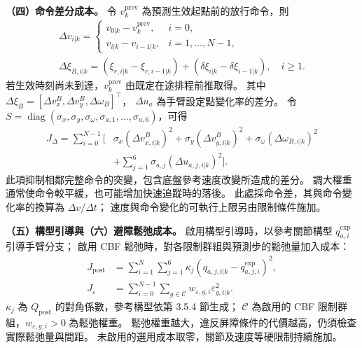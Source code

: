 \noindent\textbf{（四）命令差分成本。}
令 $v_k^{\mathrm{prev}}$ 為預測生效起點前的放行命令，則
\begin{equation}
    \begin{gathered}
        \Delta v_{i|k}=
        \begin{cases}
            v_{0|k}-v_k^{\mathrm{prev}},&i=0,\\
            v_{i|k}-v_{i-1|k},&i=1,\ldots,N-1,
        \end{cases}\\
        \Delta\xi_{B,i|k}=
        (\xi_{r,i|k}-\xi_{r,i-1|k})
        +(\delta\xi_{i|k}-\delta\xi_{i-1|k}),\quad i\geq1 .
    \end{gathered}
    \label{eq:ch3_command_difference_definition}
\end{equation}
若生效時刻尚未到達，$v_k^{\mathrm{prev}}$ 由既定在途排程前推取得。
其中 $\Delta\xi_B=[\Delta v_x^B,\Delta v_y^B,\Delta\omega_B]^\top$，
$\Delta u_a$ 為手臂設定點變化率的差分。
令 $S=\operatorname{diag}(\sigma_x,\sigma_y,\sigma_\omega,
\sigma_{a,1},\ldots,\sigma_{a,6})$，可得
\begin{equation}
    \begin{aligned}
        J_\Delta=\sum_{i=0}^{N-1}\big[&
        \sigma_x(\Delta v_{x,i|k}^{B})^{2}
        +\sigma_y(\Delta v_{y,i|k}^{B})^{2}
        +\sigma_\omega(\Delta\omega_{B,i|k})^{2}\\
        &+\sum_{j=1}^{6}\sigma_{a,j}(\Delta u_{a,j,i|k})^{2}\big].
    \end{aligned}
    \label{eq:ch3_smoothness_cost_expanded}
\end{equation}
此項抑制相鄰完整命令的突變，包含底盤參考速度改變所造成的差分。
調大權重通常使命令較平緩，也可能增加快速追蹤時的落後。
此處採命令差，其與命令變化率的換算為 $\Delta v/\Delta t$；
速度與命令變化的可執行上限另由限制條件施加。

\noindent\textbf{（五）構型引導與（六）避障鬆弛成本。}
啟用構型引導時，以參考關節構型 $q_{a,i}^{\mathrm{exp}}$ 引導手臂分支；
啟用 CBF 鬆弛時，對各限制群組與預測步的鬆弛量加入成本：
\begin{equation}
    \begin{aligned}
        J_{\mathrm{post}}
        &=\sum_{i=1}^{N}\sum_{j=1}^{6}
        \kappa_j(q_{a,j,i|k}-q_{a,j,i}^{\mathrm{exp}})^2,\\
        J_\varepsilon
        &=\sum_{i=0}^{N-1}\sum_{g\in\mathcal C}
        w_{\varepsilon,g,i}\varepsilon_{g,i|k}^{2} .
    \end{aligned}
    \label{eq:ch3_optional_cost_terms}
\end{equation}
$\kappa_j$ 為 $Q_{\mathrm{post}}$ 的對角係數，參考構型依第 3.5.4 節生成；
$\mathcal C$ 為啟用的 CBF 限制群組，$w_{\varepsilon,g,i}>0$ 為鬆弛權重。
鬆弛權重越大，違反屏障條件的代價越高，仍須檢查實際鬆弛量與間距。
未啟用的選用成本取零，關節及速度等硬限制持續施加。

